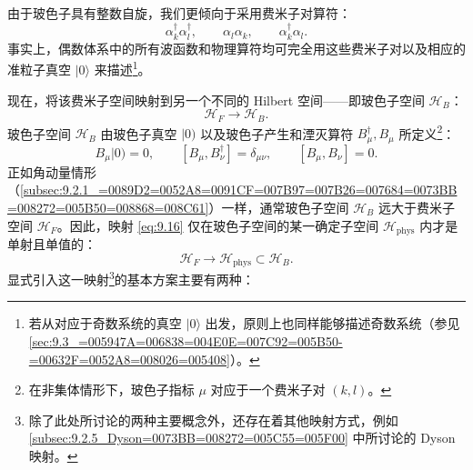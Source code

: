 由于玻色子具有整数自旋，我们更倾向于采用费米子对算符：
\begin{equation}
\alpha^{\dagger}_{k}\alpha^{\dagger}_{l},\qquad\alpha_{l}\alpha_{k},\qquad\alpha^{\dagger}_{k}\alpha_{l}.\label{eq:9.15}
\end{equation}
事实上，偶数体系中的所有波函数和物理算符均可完全用这些费米子对以及相应的准粒子真空 $|0\rangle$ 来描述\footnote{若从对应于奇数系统的真空 $|0\rangle$ 出发，原则上也同样能够描述奇数系统（参见 \ref{sec:9.3_=005947A=006838=004E0E=007C92=005B50-=00632F=0052A8=008026=005408}）。}。

现在，将该费米子空间映射到另一个不同的 Hilbert 空间——即玻色子空间 $\mathcal{H}_{B}$：
\begin{equation}
\mathcal{H}_{F}\to\mathcal{H}_{B}.\label{eq:9.16}
\end{equation}
玻色子空间 $\mathcal{H}_{B}$ 由玻色子真空 $|0)$ 以及玻色子产生和湮灭算符 $B^{\dagger}_{\mu},B_{\mu}$
所定义\footnote{在非集体情形下，玻色子指标 $\mu$ 对应于一个费米子对 $(k,l)$。}：
\begin{equation}
B_{\mu}|0)=0,\qquad[B_{\mu},B^{\dagger}_{\nu}]=\delta_{\mu\nu},\qquad[B_{\mu},B_{\nu}]=0.\label{eq:9.17}
\end{equation}
正如角动量情形（\ref{subsec:9.2.1_=0089D2=0052A8=0091CF=007B97=007B26=007684=0073BB=008272=005B50=008868=008C61}）一样，通常玻色子空间
$\mathcal{H}_{B}$ 远大于费米子空间 $\mathcal{H}_{F}$。因此，映射 \ref{eq:9.16}
仅在玻色子空间的某一确定子空间 $\mathcal{H}_{\text{phys}}$ 内才是单射且单值的：
\[
\mathcal{H}_{F}\to\mathcal{H}_{\text{phys}}\subset\mathcal{H}_{B}.
\]
显式引入这一映射\footnote{除了此处所讨论的两种主要概念外，还存在着其他映射方式，例如 \ref{subsec:9.2.5_Dyson=0073BB=008272=005C55=005F00}
中所讨论的 Dyson 映射。}的基本方案主要有两种：
